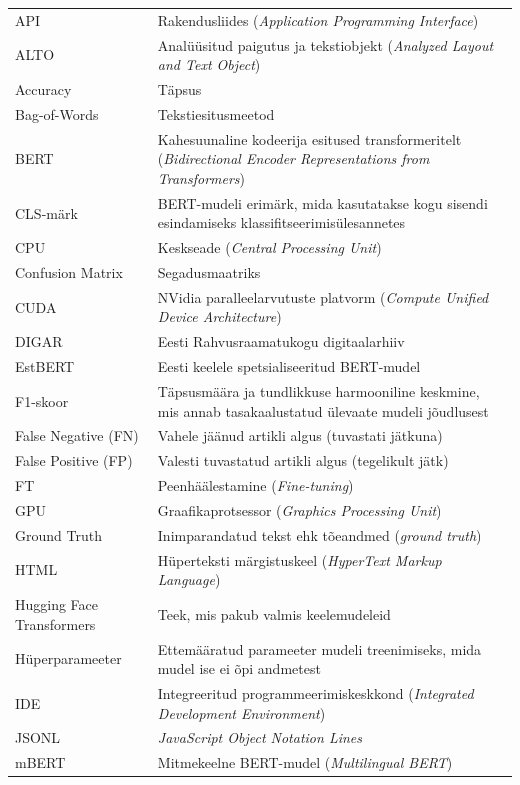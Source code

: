 \begin{longtable}{p{3cm}p{10cm}}  %
API&Rakendusliides (\textit{Application Programming Interface})\\
ALTO&Analüüsitud paigutus ja tekstiobjekt (\textit{Analyzed Layout and Text Object})\\
Accuracy&Täpsus\\
Bag-of-Words&Tekstiesitusmeetod\\
BERT&Kahesuunaline kodeerija esitused transformeritelt (\textit{Bidirectional Encoder Representations from Transformers})\\
CLS-märk&BERT-mudeli erimärk, mida kasutatakse kogu sisendi esindamiseks klassifitseerimisülesannetes\\
CPU&Keskseade (\textit{Central Processing Unit})\\
Confusion Matrix&Segadusmaatriks\\
CUDA&NVidia paralleelarvutuste platvorm (\textit{Compute Unified Device Architecture})\\
DIGAR&Eesti Rahvusraamatukogu digitaalarhiiv\\
EstBERT&Eesti keelele spetsialiseeritud BERT-mudel\\
F1-skoor&Täpsusmäära ja tundlikkuse harmooniline keskmine, mis annab tasakaalustatud ülevaate mudeli jõudlusest\\
False Negative (FN)&Vahele jäänud artikli algus (tuvastati jätkuna)\\
False Positive (FP)&Valesti tuvastatud artikli algus (tegelikult jätk)\\
FT&Peenhäälestamine (\textit{Fine-tuning})\\
GPU&Graafikaprotsessor (\textit{Graphics Processing Unit})\\
Ground Truth&Inimparandatud tekst ehk tõeandmed (\textit{ground truth})\\
HTML&Hüperteksti märgistuskeel (\textit{HyperText Markup Language})\\
Hugging Face Transformers&Teek, mis pakub valmis keelemudeleid\\
Hüperparameeter&Ettemääratud parameeter mudeli treenimiseks, mida mudel ise ei õpi andmetest\\
IDE&Integreeritud programmeerimiskeskkond (\textit{Integrated Development Environment})\\
JSONL&\textit{JavaScript Object Notation Lines}\\
mBERT&Mitmekeelne BERT-mudel (\textit{Multilingual BERT})\\

\end{longtable}
